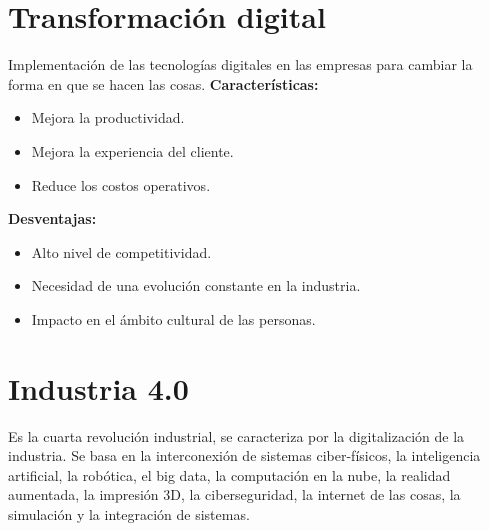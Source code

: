 \documentclass{templateNote}
\begin{document}
\section{Transformación digital}
Implementación de las tecnologías digitales en las empresas para cambiar la forma en que se hacen las cosas.\newline
\textbf{Características:}
\begin{itemize}
    \item Mejora la productividad.
    \item Mejora la experiencia del cliente.
    \item Reduce los costos operativos.
\end{itemize}
\textbf{Desventajas:}
\begin{itemize}
    \item Alto nivel de competitividad.
    \item Necesidad de una evolución constante en la industria.
    \item Impacto en el ámbito cultural de las personas.
\end{itemize}

\section{Industria 4.0}
\noindent Es la cuarta revolución industrial, se caracteriza por la digitalización de la industria. Se basa en la interconexión de sistemas ciber-físicos, la inteligencia artificial, la robótica, el big data, la computación en la nube, la realidad aumentada, la impresión 3D, la ciberseguridad, la internet de las cosas, la simulación y la integración de sistemas.
\end{document}
